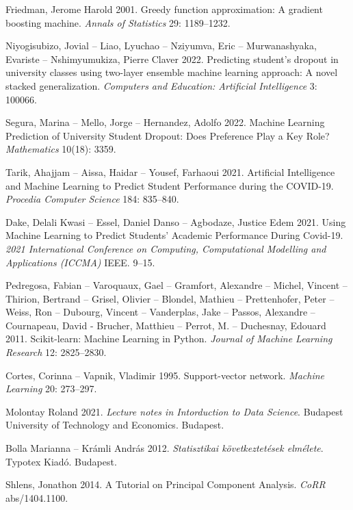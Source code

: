 \documentclass[12pt]{article}
\begin{document}
\newpage
\begin{thebibliography}{9}
Friedman, Jerome Harold 2001. Greedy function approximation: A gradient boosting machine. 
\textit{Annals of Statistics} 29: 1189--1232.

Niyogisubizo, Jovial -- Liao, Lyuchao -- Nziyumva, Eric -- Murwanashyaka, Evariste -- Nshimyumukiza, Pierre Claver 2022.
Predicting student's dropout in university classes using two-layer ensemble machine learning approach: A novel stacked generalization.
\textit{Computers and Education: Artificial Intelligence} 3: 100066.

Segura, Marina -- Mello, Jorge -- Hernandez, Adolfo 2022. Machine Learning Prediction of University Student Dropout: Does Preference Play a Key Role? \textit{Mathematics} 10(18): 3359.

Tarik, Ahajjam -- Aissa, Haidar -- Yousef, Farhaoui 2021. Artificial Intelligence and Machine Learning to Predict Student Performance during the COVID-19. \textit{Procedia Computer Science} 184: 835--840. 

Dake, Delali Kwasi -- Essel, Daniel Danso -- Agbodaze, Justice Edem 2021. Using Machine Learning to Predict Students' Academic Performance During Covid-19. \textit{2021 International Conference on Computing, Computational Modelling and Applications (ICCMA)} IEEE. 9--15.

 Pedregosa, Fabian -- Varoquaux, Gael -- Gramfort, Alexandre -- Michel, Vincent -- Thirion, Bertrand -- Grisel, Olivier -- Blondel, Mathieu -- Prettenhofer, Peter -- Weiss, Ron -- Dubourg, Vincent -- Vanderplas, Jake -- Passos, Alexandre -- Cournapeau, David - Brucher, Matthieu -- Perrot, M. -- Duchesnay, Edouard 2011. Scikit-learn: Machine Learning in Python. \textit{Journal of Machine Learning Research} 12: 2825--2830. 

Cortes, Corinna -- Vapnik, Vladimir 1995. Support-vector network. \textit{Machine Learning} 20: 273--297. 

 Molontay Roland 2021. \textit{Lecture notes in Intorduction to Data Science}. Budapest University of Technology and Economics. Budapest.

 Bolla Marianna -- Krámli András 2012. \textit{Statisztikai következtetések elmélete}. Typotex Kiadó. Budapest. 

Shlens, Jonathon 2014. A Tutorial on Principal Component Analysis. \textit{CoRR} abs/1404.1100. 


\end{thebibliography}
\end{document}
